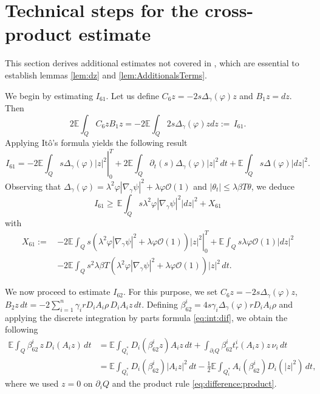 \documentclass[11pt,oneside,leqno]{amsart}
\numberwithin{equation}{section}
\numberwithin{equation}{section}
\newcommand{\E}{\mathbb{E}}
\begin{document}
\section{Technical steps for the cross-product estimate}\label{sec:proof:carleman}

This section derives additional estimates not covered in \cite{LPP:2025}, which are essential to establish lemmas \ref{lem:dz} and \ref{lem:AdditionalsTerms}.

We begin by estimating $I_{61}$. Let us define $C_6 z = -2 s \Delta_{\gamma}(\varphi) z$ and $B_1 z = dz$. Then
\begin{equation*}
2\E\int_{Q}C_6zB_1z=-2\E\int_{Q}2s\Delta_{\gamma}(\varphi)zdz:=\, I_{61}.
\end{equation*}
Applying Itô's formula yields the following result
\begin{equation*}
I_{61}=-2\left.\E\int_{Q}s\Delta_{\gamma}(\varphi)|z|^2\right|_0^T+2\E\int_{Q}\partial_{t}(s)\Delta_{\gamma}(\varphi)|z|^2\,dt+\E\int_{Q}s\Delta(\varphi)|dz|^2.
\end{equation*}
Observing that $\Delta_{\gamma}(\varphi) = \lambda^2 \varphi |\nabla_{\gamma} \psi|^2 + \lambda \varphi \mathcal{O}(1)$ and $|\theta_t| \leq \lambda \beta T \theta$, we deduce
\begin{equation*}
I_{61}\geq\,\E\int_{Q}s\lambda^2\varphi|\nabla_{\gamma}\psi|^2|dz|^2+X_{61}
\end{equation*}
with
\begin{equation*}
\begin{aligned}
X_{61}:=\,&-2\left.\E\int_{Q}s(\lambda^2\varphi|\nabla_{\gamma}\psi|^2+\lambda \varphi \mathcal{O}(1))|z|^2\right|_0^T 
+\E\int_{Q}s\lambda\varphi\mathcal{O}(1)|dz|^2\\
&-2\E\int_{Q}s^2\lambda\beta T(\lambda^2\varphi|\nabla_{\gamma}\psi|^2+\lambda \varphi \mathcal{O}(1))|z|^2\,dt.
\end{aligned}
\end{equation*}

We now proceed to estimate $I_{62}$. For this purpose, we set $C_6 z = -2 s \Delta_{\gamma}(\varphi) z$, $\displaystyle B_2 z \, dt = -2 \sum_{i=1}^{n} \gamma_i r D_i A_i \rho \, D_i A_i z \, dt.$ 
Defining $\beta_{62}^i = 4 s \gamma_i \Delta_{\gamma}(\varphi) r D_i A_i \rho$ and applying the discrete integration by parts formula \eqref{eq:int:dif}, we obtain the following
\begin{align*} 
\E \int_Q \beta_{62}^i \, z \, D_i(A_i z) \, dt 
&= \E \int_{Q_i^\ast} D_i (\beta_{62}^i z) A_i z \, dt + \int_{\partial_i Q} \beta_{62}^i t_r^i(A_i z) z \, \nu_i \, dt \\
&= \E \int_{Q_i^\ast} D_i (\beta_{62}^i) |A_i z|^2 \, dt - \frac{1}{2} \E \int_{Q_i^\ast} A_i (\beta_{62}^i) D_i(|z|^2) \, dt,
\end{align*}
where we used $z = 0$ on $\partial_i Q$ and the product rule \eqref{eq:difference:product}.
\end{document}
